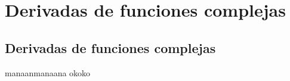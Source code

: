 \chapter{Derivadas de funciones complejas}
\section{Derivadas de funciones complejas}
manaanmanaana  okoko